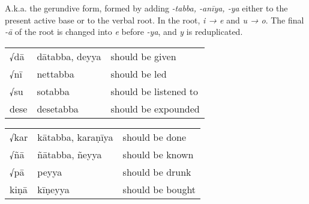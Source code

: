 \documentclass[11pt,oneside]{memoir}
\begin{document}
A.k.a. the gerundive form, formed by adding \emph{-tabba, -anīya, -ya} either to the
present active base or to the verbal root. In the root, \emph{i → e} and \emph{u → o}.
The final \emph{-ā} of the root is changed into \emph{e} before \emph{-ya}, and \emph{y} is reduplicated.

\bigskip
{\centering\par
\begin{multicols}{2}

\begin{center}
\begin{tabular}{lll}
√dā & dātabba, deyya & should be given\\[0pt]
√nī & nettabba & should be led\\[0pt]
√su & sotabba & should be listened to\\[0pt]
dese & desetabba & should be expounded\\[0pt]
\end{tabular}
\end{center}

\columnbreak

\begin{center}
\begin{tabular}{lll}
√kar & kātabba, karaṇīya & should be done\\[0pt]
√ñā & ñātabba, ñeyya & should be known\\[0pt]
√pā & peyya & should be drunk\\[0pt]
kiṇā & kīṇeyya & should be bought\\[0pt]
\end{tabular}
\end{center}

\end{multicols}
\par}

\bigskip
\end{document}
